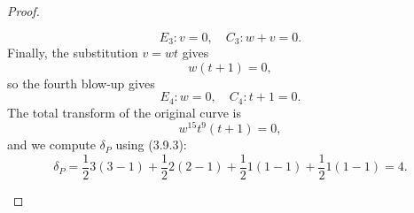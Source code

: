 \documentclass[a4paper]{article}
\begin{document}
\begin{enumerate} [label=\textbf{\arabic*.}, leftmargin=0em]
\begin{proof}
\begin{itemize} [leftmargin=0cm]
\begin{equation*}
                            E_3 : v = 0, \quad C_3 : w + v = 0.
                        \end{equation*}
                        Finally, the substitution $v = wt$ gives
                        \begin{equation*}
                            w(t + 1) = 0,
                        \end{equation*}
                        so the fourth blow-up gives
                        \begin{equation*}
                            E_4 : w = 0, \quad C_4 : t + 1 = 0.
                        \end{equation*}
                        The total transform of the original curve is
                        \begin{equation*}
                            w^{15} t^9 (t + 1) = 0,
                        \end{equation*}
                        and we compute $\delta_P$ using (3.9.3):
                        \begin{equation*}
                            \delta_P = \frac{1}{2}3(3 - 1) + \frac{1}{2}2(2 - 1) + \frac{1}{2}1(1 - 1) + \frac{1}{2}1(1 - 1) = 4.
                        \end{equation*}


\end{itemize}
\end{proof}
\end{enumerate}
\end{document}
